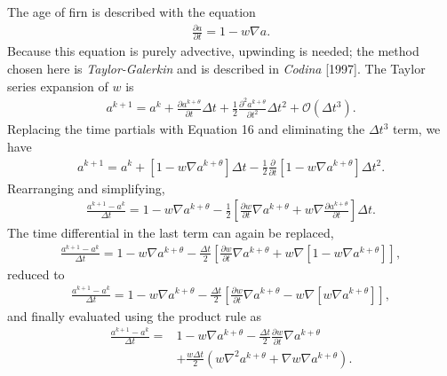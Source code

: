 \documentclass{article}%
\begin{document}
The age of firn is described with the equation
\begin{align}
  \frac{\partial a}{\partial t} = 1 - w \nabla{a}.
\end{align}
Because this equation is purely advective, upwinding is needed; the method chosen here is \emph{Taylor-Galerkin} and is described in \emph{Codina} [1997].  The Taylor series expansion of $w$ is
\begin{align*}
  a^{k+1} = a^{k} + \frac{\partial a^{k+\theta}}{\partial t}\Delta t + 
            \frac{1}{2}\frac{\partial^2 a^{k+\theta}}{\partial t^2}\Delta t^2 + 
            \mathcal{O} (\Delta t^3).
\end{align*}
Replacing the time partials with Equation 16 and eliminating the $\Delta t^3$ term, we have
\begin{align*}
  a^{k+1} = a^{k} + \left[1 - w \nabla{a}^{k+\theta} \right] \Delta t
            - \frac{1}{2}\frac{\partial}{\partial t}
              \left[1 - w \nabla{a}^{k+\theta} \right] \Delta t^2. 
\end{align*}
Rearranging and simplifying,
\begin{align*}
  \frac{a^{k+1} - a^{k}}{\Delta t} = 1 - w \nabla{a}^{k+\theta}
    - \frac{1}{2} \left[\frac{\partial w}{\partial t} \nabla{a}^{k+\theta}
      + w \nabla{\frac{\partial a^{k+\theta}}{\partial t}} \right] \Delta t. 
\end{align*}
The time differential in the last term can again be replaced, 
\begin{align*}
  \frac{a^{k+1} - a^{k}}{\Delta t} = 1 - w \nabla{a}^{k+\theta}
  - \frac{\Delta t}{2} \left[\frac{\partial w}{\partial t} \nabla{a}^{k+\theta}
    + w \nabla \left[1 - w \nabla{a^{k+\theta}} \right] \right],
\end{align*}
reduced to
\begin{align*}
  \frac{a^{k+1} - a^{k}}{\Delta t} = 1 - w \nabla{a}^{k+\theta}
  - \frac{\Delta t}{2} \left[\frac{\partial w}{\partial t} \nabla{a}^{k+\theta}
    - w \nabla \left[ w \nabla{a^{k+\theta}} \right] \right],
\end{align*}
and finally evaluated using the product rule as
\begin{align*}
  \frac{a^{k+1} - a^{k}}{\Delta t} = &1 - w \nabla{a}^{k+\theta} 
    - \frac{\Delta t}{2} \frac{\partial w}{\partial t} \nabla a^{k+\theta} \\
        &+ \frac{w \Delta t}{2} 
          \left( w \nabla^2 a^{k+\theta} + \nabla w \nabla a^{k+\theta} \right).
\end{align*}
\end{document}
